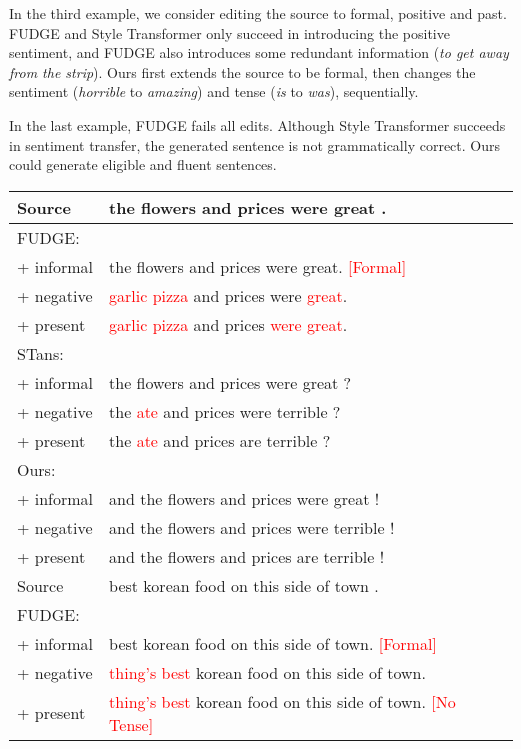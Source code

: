 \documentclass[11pt]{article}
\newcommand{\senc}[1]{\textcolor{red}{#1}}
\begin{document}
In the third example, we consider editing the source to formal, positive and past. FUDGE and Style Transformer only succeed in introducing the positive sentiment, and FUDGE also introduces some redundant information (\textit{to get away from the strip}). Ours first extends the source to be formal, then changes the sentiment (\textit{horrible} to \textit{amazing}) and tense (\textit{is} to \textit{was}), sequentially.

In the last example, FUDGE fails all edits. Although Style Transformer succeeds in sentiment transfer, the generated sentence is not grammatically correct. Ours could generate eligible and fluent sentences.

\begin{table}[ht]
    \centering
\small
    \begin{tabular}{ll}
    \toprule
          Source & the flowers and prices were great . \\
         \midrule
           FUDGE:&\\
         + informal&the flowers and prices were great. \senc{[Formal]}\\
         \quad + negative& \senc{garlic pizza} and prices were \senc{great}.\\
         \quad\quad + present&\senc{garlic pizza} and prices \senc{were great}.\\
          STans:&\\
         + informal&the flowers and prices were great ?\\
         \quad+ negative&the \senc{ate} and prices were terrible ?\\
         \quad\quad+ present&the \senc{ate} and prices are terrible ?\\
          Ours:& \\
         + informal& and the flowers and prices were great ! \\
         \quad+ negative& and the flowers and prices were terrible !\\
         \quad\quad+ present& and the flowers and prices are terrible !\\\midrule
         Source & best korean food on this side of town .\\\midrule
         FUDGE:&\\
         + informal&best korean food on this side of town. \senc{[Formal]}\\
         \quad+ negative&\senc{thing's best} korean food on this side of town.\\
         \quad\quad+ present &\senc{thing's best} korean food on this side of town. \senc{[No Tense]}\\

\end{tabular}
\end{table}
\end{document}
